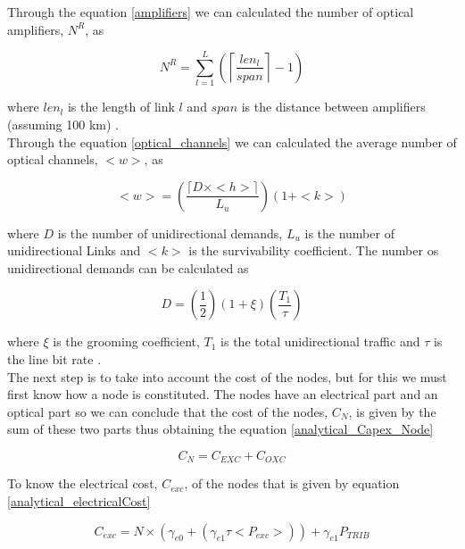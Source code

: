 Through the equation \ref{amplifiers} we can calculated the number of optical amplifiers, $N^R$, as

\begin{equation}
N^R = \sum\limits_{l=1}^L\left(\left\lceil\frac{len_l}{span}\right\rceil-1\right)
\label{amplifiers}
\end{equation}

\vspace{11pt}
\noindent
where $len_l$ is the length of link $l$ and $span$ is the distance between amplifiers (assuming 100 km) \cite{aulas}.\\

Through the equation \ref{optical_channels} we can calculated the average number of optical channels, $<w>$, as

\begin{equation}
<w> = \left( \frac{\lceil D \times <h> \rceil}{L_u} \right) \left( 1 + <k>\right)
\label{optical_channels}
\end{equation}

\noindent
where $D$ is the number of unidirectional demands, $L_u$ is the number of unidirectional Links and $<k>$ is the survivability coefficient.
The number os unidirectional demands can be calculated as

\begin{equation}
D = \left(\frac{1}{2}\right) \left( 1 + \xi \right) \left(\frac{T_1}{\tau}\right)
\label{demands}
\end{equation}

\noindent
where $\xi$ is the grooming coefficient, $T_1$ is the total unidirectional traffic and $\tau$ is the line bit rate \cite{aulas}.\\

The next step is to take into account the cost of the nodes, but for this we must first know how a node is constituted. The nodes have an electrical part and an optical part so we can conclude that the cost of the nodes, $C_N$, is given by the sum of these two parts thus obtaining the equation \ref{analytical_Capex_Node}

\begin{equation}
C_N = C_{EXC} + C_{OXC}
\label{analytical_Capex_Node}
\end{equation}

\vspace{11pt}
To know the electrical cost, $C_{exc}$, of the nodes that is given by equation \ref{analytical_electricalCost}

\begin{equation}
C_{exc} = N \times \left( \gamma_{e0} + \left( \gamma_{e1} \tau <P_{exc}> \right) \right) + \gamma_{e1} P_{TRIB}
\label{analytical_electricalCost}
\end{equation}

